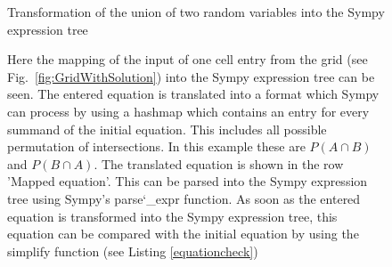         \begin{figure}
            
            \caption{Transformation of the union of two random variables into the Sympy expression tree}
            \caption*{Here the mapping of the input of one cell entry from the grid (see Fig.~\ref{fig:GridWithSolution}) into the Sympy expression tree can be seen. The entered equation is translated
            into a format which Sympy can process by using a hashmap which contains an entry for every summand of the initial equation. This includes all possible permutation of intersections. In this
            example these are $P(A \cap B)$ and $P(B \cap A)$. The translated equation is shown in the row 'Mapped equation'. This can be parsed into the Sympy expression tree using
            Sympy's parse\char`_expr function. As soon as the entered equation is transformed into the Sympy expression tree, this equation can be compared with the initial equation
            by using the simplify function (see Listing \ref{equationcheck})}
            \label{mappinginputexpressiontree}
        \end{figure}

